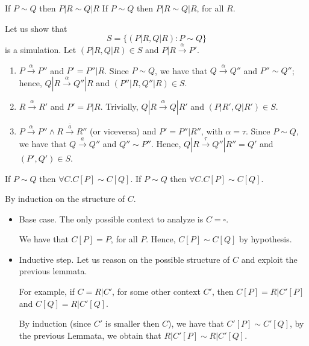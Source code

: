 \begin{Lemma}{If $P\sim Q$ then $P|R\sim Q|R$}{}\label{lemma:pq-pbarrqbarr}
If $P\sim Q$ then $P|R\sim Q|R$, for all $R$.
\begin{demonstration}
    Let us show that
    \begin{equation*}
        S = \{(P|R, Q|R): P\sim Q\}
    \end{equation*}
    is a simulation. Let $(P|R, Q|R)\in S$ and $P|R\xrightarrow{\alpha}P'$.
    \begin{enumerate}
        \item $P\xrightarrow{\alpha}P''$ and $P' = P''|R$. Since $P\sim Q$, we have that $Q\xrightarrow{\alpha}Q''$ and $P''\sim Q''$; hence, $Q|R\xrightarrow{\alpha}Q''|R$ and $(P''|R, Q''|R)\in S$.
        \item $R\xrightarrow{\alpha}R'$ and $P' = P|R$. Trivially, $Q|R\xrightarrow{\alpha}Q|R'$ and $(P|R', Q|R')\in S$.
        \item $P\xrightarrow{\alpha}P''\land R\xrightarrow{\overline{a}}R''$ (or viceversa) and $P'=P''|R''$, with $\alpha = \tau$. Since $P\sim Q$, we have that $Q\xrightarrow{a}Q''$ and $Q''\sim P''$. Hence, $Q|R\xrightarrow{\tau}Q''|R''=Q'$ and $(P', Q')\in S$.
    \end{enumerate}
\end{demonstration}
\end{Lemma}

\begin{Thm}{If $P\sim Q$ then $\forall C.C[P]\sim C[Q]$.}{}
If $P\sim Q$ then $\forall C.C[P]\sim C[Q]$.
\begin{demonstration}
    By induction on the structure of $C$.
    \begin{itemize}
        \item Base case. The only possible context to analyze is $C=\square$. 
        
        We have that $C[P]=P$, for all $P$. Hence, $C[P]\sim C[Q]$ by hypothesis.
        \item Inductive step. Let us reason on the possible structure of $C$ and exploit the previous lemmata.

        For example, if $C = R|C'$, for some other context $C'$, then $C[P]=R|C'[P]$ and $C[Q]=R|C'[Q]$. 
        
        By induction (since $C'$ is smaller then $C$), we have that $C'[P]\sim C'[Q]$, by the previous Lemmata, we obtain that $R|C'[P]\sim R|C'[Q]$.
    \end{itemize}
\end{demonstration}
\end{Thm}

